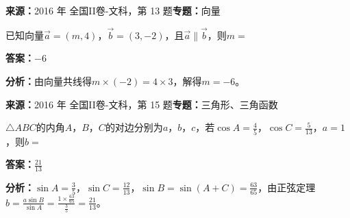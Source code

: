 \begin{question}[points=5]
\textbf{来源：}2016 年 全国II卷-文科，第 13 题\quad \textbf{专题：}向量\par
已知向量$\vec{a}=(m,4)$，$\vec{b}=(3,-2)$，且$\vec{a}\parallel\vec{b}$，则$m=$
\fillin[{$-6$}]
\begin{solution}
\textbf{答案：}$-6$

\textbf{分析：}由向量共线得$m\times(-2)=4\times3$，解得$m=-6$。
\end{solution}
\end{question}

\begin{question}[points=5]
\textbf{来源：}2016 年 全国II卷-文科，第 15 题\quad \textbf{专题：}三角形、三角函数\par
$\triangle ABC$的内角$A$，$B$，$C$的对边分别为$a$，$b$，$c$，若$\cos A=\frac{4}{5}$，$\cos C=\frac{5}{13}$，$a=1$，则$b=$
\fillin[{$\frac{21}{13}$}]
\begin{solution}
\textbf{答案：}$\frac{21}{13}$

\textbf{分析：}$\sin A=\frac{3}{5}$，$\sin C=\frac{12}{13}$，$\sin B=\sin(A+C)=\frac{63}{65}$，由正弦定理$b=\frac{a\sin B}{\sin A}=\frac{1\times\frac{63}{65}}{\frac{3}{5}}=\frac{21}{13}$。
\end{solution}
\end{question}

